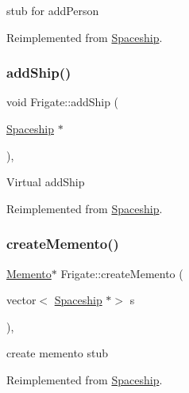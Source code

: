 stub for add\+Person 

Reimplemented from \hyperlink{classSpaceship_add8d9c6dfd5f6ecb8399e41e71e5b22f}{Spaceship}.

\mbox{\label{classFrigate_a000802431ba3db8b45bfa6e7ae153de4}} 
\subsubsection{\texorpdfstring{add\+Ship()}{addShip()}}
{\footnotesize\ttfamily void Frigate\+::add\+Ship (\begin{DoxyParamCaption}\item[{\hyperlink{classSpaceship}{Spaceship} $\ast$}]{ }\end{DoxyParamCaption})\hspace{0.3cm}{\ttfamily [inline]}, {\ttfamily [virtual]}}

Virtual add\+Ship 

Reimplemented from \hyperlink{classSpaceship_a90e1321cdbcb459b98b75ab39cef867d}{Spaceship}.

\mbox{\label{classFrigate_a69d6b412c52d49b55135516d3e0b2a64}} 
\subsubsection{\texorpdfstring{create\+Memento()}{createMemento()}}
{\footnotesize\ttfamily \hyperlink{classMemento}{Memento}$\ast$ Frigate\+::create\+Memento (\begin{DoxyParamCaption}\item[{vector$<$ \hyperlink{classSpaceship}{Spaceship} $\ast$$>$}]{s }\end{DoxyParamCaption})\hspace{0.3cm}{\ttfamily [inline]}, {\ttfamily [virtual]}}

create memento stub 

Reimplemented from \hyperlink{classSpaceship_a6d272f846b019dec8226ddab65648a7b}{Spaceship}.

\mbox{\label{classFrigate_a756cc705b54d5aa48d4529bbfbeee74f}} 
